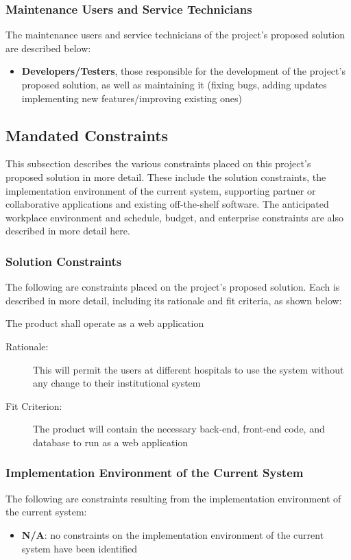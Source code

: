 \documentclass[12pt]{article}
\begin{document}
\subsubsection{Maintenance Users and Service Technicians}
The maintenance users and service technicians of the project’s proposed solution are described below:
\begin{itemize}
    \item \textbf{Developers/Testers}, those responsible for the development of the project’s proposed solution, as well as maintaining it (fixing bugs, adding updates implementing new features/improving existing ones) 
\end{itemize}

\subsection{Mandated Constraints}
This subsection describes the various constraints placed on this project's proposed solution in more detail. These include the solution constraints, the implementation environment of the current system, supporting partner or collaborative applications and existing off-the-shelf software. The anticipated workplace environment and schedule, budget, and enterprise constraints are also described in more detail here.

\subsubsection{Solution Constraints}
The following are constraints placed on the project’s proposed solution. Each is described in more detail, including its rationale and fit criteria, as shown below:
\begin{enumerate}[label=MC\arabic*., series=mc]
    \begin{item}
        The product shall operate as a web application
        \begin{description} 
            \item[Rationale:] This will permit the users at different hospitals to use the system without any change to their institutional system
            \item[Fit Criterion:] The product will contain the necessary back-end, front-end code, and database to run as a web application
        \end{description}
    \end{item}
\end{enumerate}

\subsubsection{Implementation Environment of the Current System}
The following are constraints resulting from the implementation environment of the current system:
\begin{itemize}
    \item \textbf{N/A}: no constraints on the implementation environment of the current system have been identified
\end{itemize}
\end{document}
